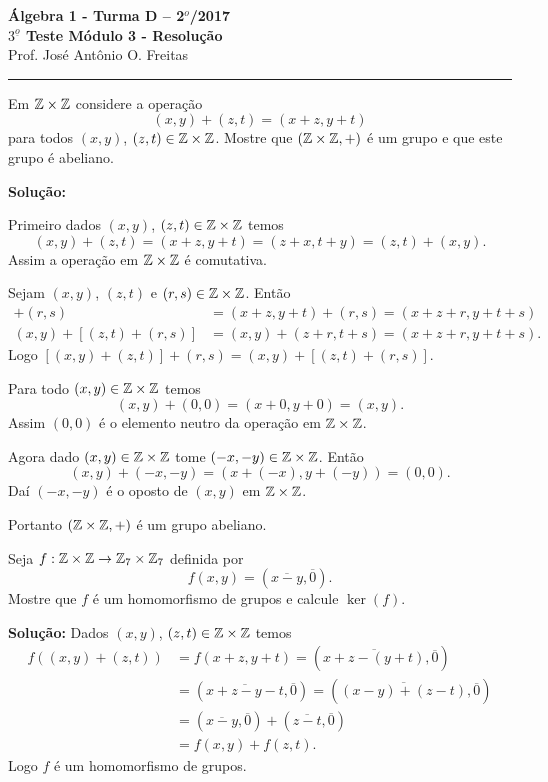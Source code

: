 \documentclass[12pt]{article}
\begin{document}


\begin{center}
{\Large\bf {\'A}lgebra 1 - Turma D -- 2$^{o}$/2017} \\ \vspace{9pt} {\large\bf
  $3^{\underline{o}}$ Teste Módulo 3 - Resolu\c{c}\~ao}\\
\vspace{9pt} Prof. Jos{\'e} Ant{\^o}nio O. Freitas
\end{center}
\hrule

\vspace{.6cm}

\questao Em $\mathbb{Z} \times\mathbb{Z}$ considere a operação
\[
	(x, y) + (z, t) = (x + z, y + t)
\]
para todos $(x,y)$, $(z,t) \in \mathbb{Z}\times\mathbb{Z}$. Mostre que $(\mathbb{Z}\times\mathbb{Z}, +)$ é um grupo e que este grupo é abeliano.

\noindent\textbf{Solu\c{c}\~ao:}

Primeiro dados $(x,y)$, $(z,t) \in \mathbb{Z}\times\mathbb{Z}$ temos
\[
	(x,y) + (z,t) = (x+z,y+t) = (z+x,t+y) = (z,t) + (x,y).
\]
Assim a operação em $\mathbb{Z}\times\mathbb{Z}$ é comutativa.

Sejam $(x,y)$, $(z,t)$ e $(r,s) \in \mathbb{Z}\times\mathbb{Z}$. Então
\begin{align*}
	[(x,y) + (z,t)] + (r,s) &= (x + z, y+t) + (r,s) = (x+z+r,y+t+s)\\
	(x,y) + [(z,t)+(r,s)] &= (x,y) + (z+r,t+s) = (x+z+r,y+t+s).
\end{align*}
Logo $[(x,y)+(z,t)] + (r,s) = (x,y) + [(z,t) + (r,s)]$.

Para todo $(x,y) \in \mathbb{Z}\times\mathbb{Z}$ temos
\[
	(x,y) + (0,0) = (x+0,y+0) = (x,y).
\]
Assim $(0,0)$ é o elemento neutro da operação em $\mathbb{Z}\times\mathbb{Z}$.

Agora dado $(x,y) \in \mathbb{Z}\times\mathbb{Z}$ tome $(-x,-y) \in \mathbb{Z}\times\mathbb{Z}$. Então
\[
	(x,y) + (-x,-y) = (x+(-x),y+(-y)) = (0,0).
\]
Daí $(-x,-y)$ é o oposto de $(x,y)$ em $\mathbb{Z}\times\mathbb{Z}$.

Portanto $(\mathbb{Z}\times\mathbb{Z},+)$ é um grupo abeliano.

\vspace{1cm}

\questao Seja $f : \mathbb{Z}\times\mathbb{Z} \to \mathbb{Z}_7\times\mathbb{Z}_7$ definida por
\[
	f(x,y) = (\overline{x-y},\overline{0}).
\]
Mostre que $f$ é um homomorfismo de grupos e calcule $\ker(f)$.

\noindent\textbf{Solu\c{c}\~ao:} Dados $(x,y)$, $(z,t) \in \mathbb{Z}\times\mathbb{Z}$ temos
\begin{align*}
	f((x,y) + (z,t)) &= f(x+z,y+t) = (\overline{x+z - (y+t)},\overline{0}) \\ &= (\overline{x+z - y - t}, \overline{0}) = (\overline{(x-y) + (z-t)},\overline{0}) \\ &= (\overline{x-y},\overline{0}) + (\overline{z-t},\overline{0}) \\ &= f(x,y) + f(z,t).
\end{align*}
Logo $f$ é um homomorfismo de grupos.
\end{document}
